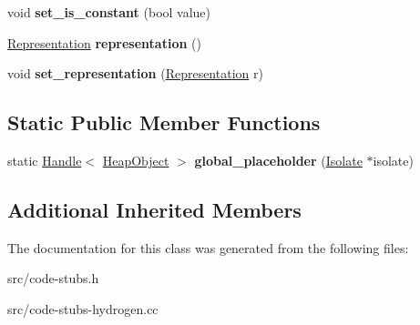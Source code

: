 \begin{DoxyCompactItemize}
\item 
\hypertarget{classv8_1_1internal_1_1_store_global_stub_ad6c888a72dfbdefa8d8d330a54aed0cd}{}void {\bfseries set\+\_\+is\+\_\+constant} (bool value)\label{classv8_1_1internal_1_1_store_global_stub_ad6c888a72dfbdefa8d8d330a54aed0cd}

\item 
\hypertarget{classv8_1_1internal_1_1_store_global_stub_a28c5eefaf6ec35d168624935746876c6}{}\hyperlink{classv8_1_1internal_1_1_representation}{Representation} {\bfseries representation} ()\label{classv8_1_1internal_1_1_store_global_stub_a28c5eefaf6ec35d168624935746876c6}

\item 
\hypertarget{classv8_1_1internal_1_1_store_global_stub_aaa20114121d0cf8769a6ed37c90326fc}{}void {\bfseries set\+\_\+representation} (\hyperlink{classv8_1_1internal_1_1_representation}{Representation} r)\label{classv8_1_1internal_1_1_store_global_stub_aaa20114121d0cf8769a6ed37c90326fc}

\end{DoxyCompactItemize}
\subsection*{Static Public Member Functions}
\begin{DoxyCompactItemize}
\item 
\hypertarget{classv8_1_1internal_1_1_store_global_stub_a186c5eed94b68f630c5d4ba5a77ce394}{}static \hyperlink{classv8_1_1internal_1_1_handle}{Handle}$<$ \hyperlink{classv8_1_1internal_1_1_heap_object}{Heap\+Object} $>$ {\bfseries global\+\_\+placeholder} (\hyperlink{classv8_1_1internal_1_1_isolate}{Isolate} $\ast$isolate)\label{classv8_1_1internal_1_1_store_global_stub_a186c5eed94b68f630c5d4ba5a77ce394}

\end{DoxyCompactItemize}
\subsection*{Additional Inherited Members}


The documentation for this class was generated from the following files\+:\begin{DoxyCompactItemize}
\item 
src/code-\/stubs.\+h\item 
src/code-\/stubs-\/hydrogen.\+cc\end{DoxyCompactItemize}
